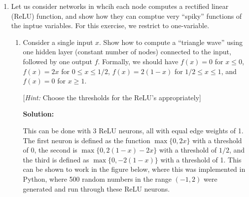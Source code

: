 \documentclass[12pt]{article}
\begin{document}
\begin{enumerate}
Now suppose that all the weights are initialized to $0$, and suppose we start performing SGD using backprop, with a fixed learning rate. Show that at every time step, all the edge weights in a layer are equal.

   {\bf Solution:}

The equation for the sigmoid function is

\begin{align*}
  \sigma(\bm{\theta}_{i}) &= \frac{1}{1 + e^{-\bm{\theta}_{i}}}\\
  \intertext{And we can obtain the derivative as}
  \sigma^{\prime}(\bm{\theta}_{i}) &= \frac{1}{\left[1 + e^{\bm{\theta}_{i}} \right]\left[ 1 + e^{-\bm{\theta}_{i}}\right]}
  \intertext{Finally, we can say that the Jacobian/Cost function for the update is defined as}
  J_{\bm{\theta}}(\sigma) &= \text{diag}(\sigma^{\prime}(\bm{\theta}))
\end{align*}

Where the update is performed by multiplying the weight matrix by $J_{\bm{\theta}}(\sigma)$, which would obtain all of the same values in the back propogation step. There is no source of asymmetry between the neurons when they're initialized the same meaning the neural network can't learn.

\newpage

\item Let us consider networks in whcih each node computes a rectified linear (ReLU) function, and show how they can comptue very ``spiky'' functions of the inptue variables. For this exercise, we restrict to one-variable.

\begin{enumerate}
  \item Consider a single input $x$. Show how to compute a ``triangle wave'' using one hidden layer (constant number of nodes) connected to the input, followed by one output $f$. Formally, we should have $f(x) = 0$ for $x \leq 0$, $f(x) = 2x$ for $0 \leq x \leq 1/2$, $f(x) = 2(1-x)$ for $1/2 \leq x \leq 1$, and $f(x) = 0$ for $x \geq 1$. 

[{\em Hint:} Choose the thresholds for the ReLU's appropriately]

   {\bf Solution:}

This can be done with 3 ReLU neurons, all with equal edge weights of 1. The first neuron is defined as the function $\max\{0, 2x\}$ with a threshold of 0, the second is $\max\{0, 2(1-x) - 2x\}$ with a threshold of $1/2$, and the third is defined as $\max\{0, -2(1-x)\}$ with a threshold of 1. This can be shown to work in the figure below, where this was implemented in Python, where 500 random numbers in the range $(-1, 2)$ were generated and run through these ReLU neurons. 


\end{enumerate}
\end{enumerate}
\end{document}
